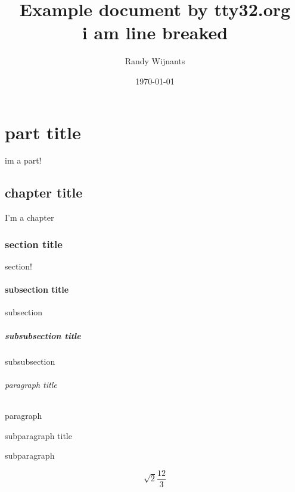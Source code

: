\documentclass[11pt,a4paper]{report}
\begin{document}
	\newcommand{\tty}{tty32.org}

	\title{Example document by \tty \\
			i am line breaked}
	\author{Randy Wijnants}
	\date{\today} %
	\maketitle

	\tableofcontents
	\listoffigures 
	\listoftables 
	\lstlistoflistings

%
%

	\part {part title}
	im a part!

	\chapter{chapter title}
	I'm a chapter

	\section{section title}
	section!

	\subsection{subsection title}
	subsection

	\subsubsection{subsubsection title}
	subsubsection

	\paragraph{paragraph title}
	paragraph

	\subparagraph{subparagraph title}
	subparagraph

		\begin{equation} \label{eq:solved}
		\sqrt{2}{\frac{12}{3}}
		\end{equation}
\end{document}
